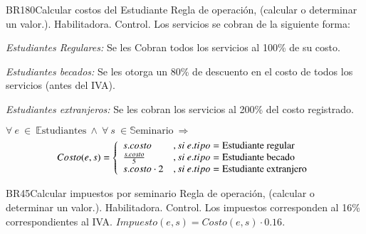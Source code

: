 \begin{BussinesRule}{BR180}{Calcular costos del Estudiante}
	\BRitem[Tipo:] Regla de operación, (calcular o determinar un valor.).
	\BRitem[Clase:] Habilitadora.
	\BRitem[Nivel:] Control. %
	\BRitem[Descripción:] Los servicios se cobran de la siguiente forma:
	\begin{Citemize}
		\item {\em Estudiantes Regulares:} Se les Cobran todos los servicios al 100\% de su costo.
		\item {\em Estudiantes becados:} Se les otorga un 80\% de descuento en el costo de todos los servicios (antes del IVA).
		\item {\em Estudiantes extranjeros:} Se les cobran los servicios al 200\% del costo registrado.
	\end{Citemize}
	\BRitem[Sentencia:] $\forall~e~\in~\mathbb{E}\textrm{studiantes}~\land~\forall~s~\in \mathbb{S}\textrm{eminario}~\Rightarrow$
	\begin{displaymath}
		Costo(e,s) = \left\{ \begin{array}{ll}
			s.costo           & , si~e.tipo = \textrm{Estudiante regular}    \\
			{s.costo}\over{5} & , si~e.tipo = \textrm{Estudiante becado}     \\
			s.costo \cdot 2   & , si~e.tipo = \textrm{Estudiante extranjero}
		\end{array} \right.
	\end{displaymath}


\end{BussinesRule}

\begin{BussinesRule}{BR45}{Calcular impuestos por seminario}
	\BRitem[Tipo:] Regla de operación, (calcular o determinar un valor.).
	\BRitem[Clase:] Habilitadora.
	\BRitem[Nivel:] Control. %
	\BRitem[Descripción:] Los impuestos corresponden al 16\% correspondientes al IVA.
	\BRitem[Sentencia:] $Impuesto(e, s) = Costo(e, s)\cdot0.16$.


\end{BussinesRule}

